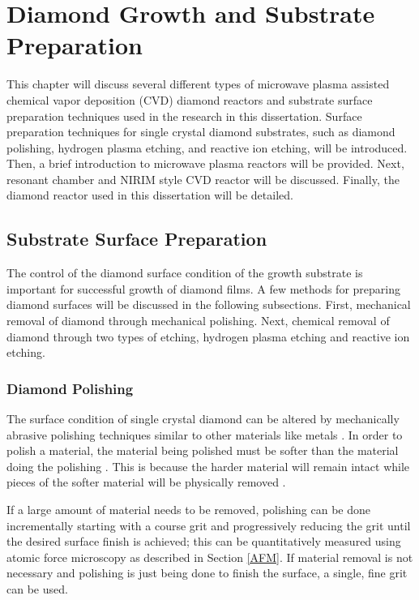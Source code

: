 \chapter{Diamond Growth and Substrate Preparation} 
\label{chDiamondGrowth}
\indent


This chapter will discuss several different types of microwave plasma assisted chemical vapor deposition (CVD) diamond reactors and substrate surface preparation techniques used in the research in this dissertation. Surface preparation techniques for single crystal diamond substrates, such as diamond polishing, hydrogen plasma etching, and reactive ion etching, will be introduced. Then, a brief introduction to microwave plasma reactors will be provided. Next, resonant chamber and NIRIM style CVD reactor will be discussed. Finally, the diamond reactor used in this dissertation will be detailed.

\section{Substrate Surface Preparation}
\indent
The control of the diamond surface condition of the growth substrate is important for successful growth of diamond films. A few methods for preparing diamond surfaces will be discussed in the following subsections. First, mechanical removal of diamond through mechanical polishing. Next, chemical removal of diamond through two types of etching, hydrogen plasma etching and reactive ion etching.

\subsection{Diamond Polishing}
\indent

The surface condition of single crystal diamond can be altered by mechanically abrasive polishing techniques similar to other materials like metals \cite{ASTMInternational2025GuideSpecimens}. In order to polish a material, the material being polished must be softer than the material doing the polishing \cite{Schuelke2013DiamondPolishing, Ranjan2019}. This is because the harder material will remain intact while pieces of the softer material will be physically removed \cite{Malshe1999ASubstrates}.

If a large amount of material needs to be removed, polishing can be done incrementally starting with a course grit and progressively reducing the grit until the desired surface finish is achieved; this can be quantitatively measured using atomic force microscopy as described in Section \ref{AFM}. If material removal is not necessary and polishing is just being done to finish the surface, a single, fine grit can be used.

